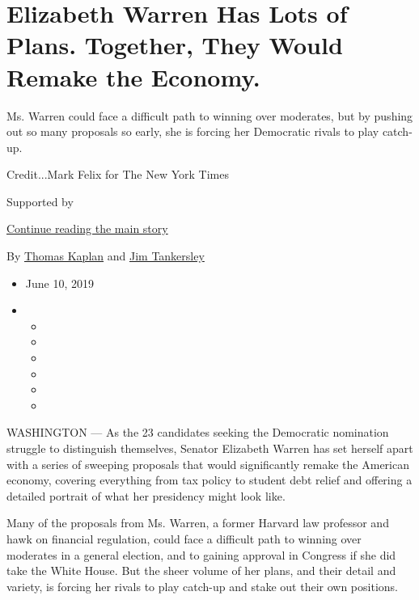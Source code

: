 \hypertarget{elizabeth-warren-has-lots-of-plans-together-they-would-remake-the-economy}{%
\section{Elizabeth Warren Has Lots of Plans. Together, They Would Remake
the
Economy.}\label{elizabeth-warren-has-lots-of-plans-together-they-would-remake-the-economy}}

Ms. Warren could face a difficult path to winning over moderates, but by
pushing out so many proposals so early, she is forcing her Democratic
rivals to play catch-up.

Credit...Mark Felix for The New York Times

Supported by

\protect\hyperlink{after-sponsor}{Continue reading the main story}

By \href{https://www.nytimes3xbfgragh.onion/by/thomas-kaplan}{Thomas
Kaplan} and
\href{https://www.nytimes3xbfgragh.onion/by/jim-tankersley}{Jim
Tankersley}

\begin{itemize}
\item
  June 10, 2019
\item
  \begin{itemize}
  \item
  \item
  \item
  \item
  \item
  \item
  \end{itemize}
\end{itemize}

WASHINGTON --- As the 23 candidates seeking the Democratic nomination
struggle to distinguish themselves, Senator Elizabeth Warren has set
herself apart with a series of sweeping proposals that would
significantly remake the American economy, covering everything from tax
policy to student debt relief and offering a detailed portrait of what
her presidency might look like.

Many of the proposals from Ms. Warren, a former Harvard law professor
and hawk on financial regulation, could face a difficult path to winning
over moderates in a general election, and to gaining approval in
Congress if she did take the White House. But the sheer volume of her
plans, and their detail and variety, is forcing her rivals to play
catch-up and stake out their own positions.

